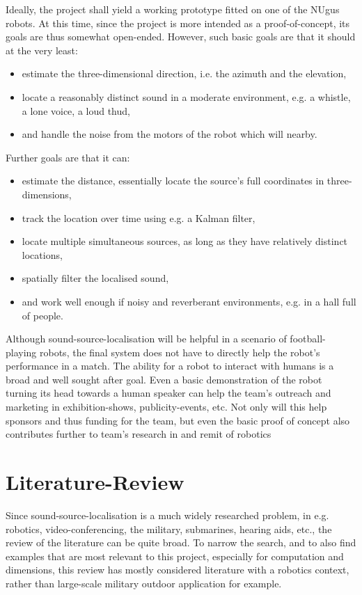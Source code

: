 \documentclass{report}
\begin{document}
Ideally, the project shall yield a working prototype fitted on one of the NUgus robots. At this time, since the project is more intended as a proof-of-concept, its goals are thus somewhat open-ended. However, such basic goals are that it should at the very least:
\begin{itemize}
	\item estimate the three-dimensional direction, i.e. the azimuth and the elevation,
	\item locate a reasonably distinct sound in a moderate environment, e.g. a whistle, a lone voice, a loud thud,
	\item and handle the noise from the motors of the robot which will nearby.
\end{itemize}
Further goals are that it can:
\begin{itemize}
	\item estimate the distance, essentially locate the source's full coordinates in three-dimensions,
	\item track the location over time using e.g. a Kalman filter,
	\item locate multiple simultaneous sources, as long as they have relatively distinct locations,
	\item spatially filter the localised sound,
	\item and work well enough if noisy and reverberant environments, e.g. in a hall full of people.
\end{itemize}


Although sound-source-localisation will be helpful in a scenario of football-playing robots, the final system does not have to directly help the robot's performance in a match. The ability for a robot to interact with humans is a broad and well sought after goal. Even a basic demonstration of the robot turning its head towards a human speaker can help the team's outreach and marketing in exhibition-shows, publicity-events, etc. Not only will this help sponsors and thus funding for the team, but even the basic proof of concept also contributes further to team's research in and remit of robotics 

\chapter{Literature-Review}

Since sound-source-localisation is a much widely researched problem, in e.g. robotics, video-conferencing, the military, submarines, hearing aids, etc., the review of the literature can be quite broad. To narrow the search, and to also find examples that are most relevant to this project, especially for computation and dimensions, this review has mostly considered literature with a robotics context, rather than large-scale military outdoor application for example. 
\end{document}
